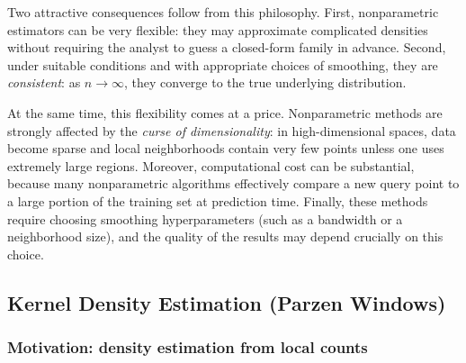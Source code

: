 Two attractive consequences follow from this philosophy. First, nonparametric estimators can be very flexible: they may approximate complicated densities without requiring the analyst to guess a closed-form family in advance. Second, under suitable conditions and with appropriate choices of smoothing, they are \emph{consistent}: as \(n\to\infty\), they converge to the true underlying distribution.

At the same time, this flexibility comes at a price. Nonparametric methods are strongly affected by the \emph{curse of dimensionality}: in high-dimensional spaces, data become sparse and local neighborhoods contain very few points unless one uses extremely large regions. Moreover, computational cost can be substantial, because many nonparametric algorithms effectively compare a new query point to a large portion of the training set at prediction time. Finally, these methods require choosing smoothing hyperparameters (such as a bandwidth or a neighborhood size), and the quality of the results may depend crucially on this choice.

\medskip

\subsection*{Kernel Density Estimation (Parzen Windows)}

\subsubsection*{Motivation: density estimation from local counts}

